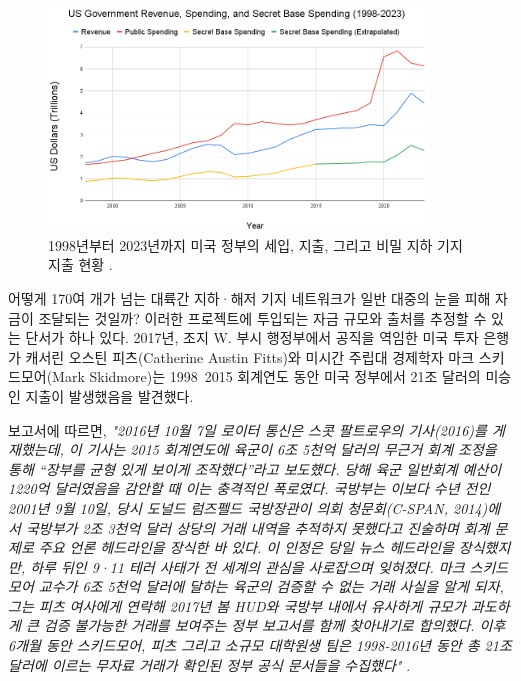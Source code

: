 \documentclass[10pt,twocolumn,letterpaper]{article}
\begin{document}
\begin{figure}[t]
\begin{center}
\includegraphics[width=0.9\textwidth]{govcrop2.png}
\end{center}
   \caption{1998년부터 2023년까지 미국 정부의 세입, 지출, 그리고 비밀 지하 기지 지출 현황 \cite{19}.}
   \label{fig:9}
\end{figure}

어떻게 170여 개가 넘는 대륙간 지하·해저 기지 네트워크가 일반 대중의 눈을 피해 자금이 조달되는 것일까? 이러한 프로젝트에 투입되는 자금 규모와 출처를 추정할 수 있는 단서가 하나 있다. 2017년, 조지 W. 부시 행정부에서 공직을 역임한 미국 투자 은행가 캐서린 오스틴 피츠(Catherine Austin Fitts)와 미시간 주립대 경제학자 마크 스키드모어(Mark Skidmore)는 1998~2015 회계연도 동안 미국 정부에서 21조 달러의 미승인 지출이 발생했음을 발견했다\cite{11,12,13}.

보고서에 따르면, \textit{"2016년 10월 7일 로이터 통신은 스콧 팔트로우의 기사(2016)를 게재했는데, 이 기사는 2015 회계연도에 육군이 6조 5천억 달러의 무근거 회계 조정을 통해 “장부를 균형 있게 보이게 조작했다”라고 보도했다. 당해 육군 일반회계 예산이 1220억 달러였음을 감안할 때 이는 충격적인 폭로였다. 국방부는 이보다 수년 전인 2001년 9월 10일, 당시 도널드 럼즈펠드 국방장관이 의회 청문회(C-SPAN, 2014)에서 국방부가 2조 3천억 달러 상당의 거래 내역을 추적하지 못했다고 진술하며 회계 문제로 주요 언론 헤드라인을 장식한 바 있다. 이 인정은 당일 뉴스 헤드라인을 장식했지만, 하루 뒤인 9·11 테러 사태가 전 세계의 관심을 사로잡으며 잊혀졌다. 마크 스키드모어 교수가 6조 5천억 달러에 달하는 육군의 검증할 수 없는 거래 사실을 알게 되자, 그는 피츠 여사에게 연락해 2017년 봄 HUD와 국방부 내에서 유사하게 규모가 과도하게 큰 검증 불가능한 거래를 보여주는 정부 보고서를 함께 찾아내기로 합의했다. 이후 6개월 동안 스키드모어, 피츠 그리고 소규모 대학원생 팀은 1998-2016년 동안 총 21조 달러에 이르는 무자료 거래가 확인된 정부 공식 문서들을 수집했다"} \cite{12}.
\end{document}
